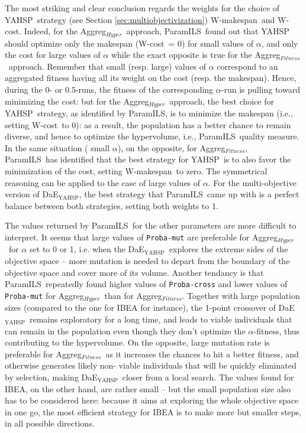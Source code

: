 \documentclass{llncs}
\newcommand{\DAEYAHSP}{{\sc DaE$_{\text{YAHSP}}$}}
\def\YAHSP{{\sc YAHSP}}
\def\PARAMILS{{\sc ParamILS}}
\def\AGGREGHYPER{{Aggreg$_{Hyper}$}}
\def\AGGREGFITNESS{{Aggreg$_{Fitness}$}}
\def\WMAKESPAN{{W-makespan}}
\def\WCOST{{W-cost}}
\begin{document}
The most striking and clear conclusion regards the weights for the choice of \YAHSP\ strategy (see Section \ref{sec:multiobjectivization}) \WMAKESPAN\ and \WCOST. Indeed, for the \AGGREGHYPER\ approach, \PARAMILS\ found out that YAHSP should optimize only the makespan (\WCOST\ = 0) for small values of $\alpha$, and only the cost for large values of $\alpha$ while the exact opposite is true for the \AGGREGFITNESS\ approach. Remember that small (resp. large) values of $\alpha$ correspond to an aggregated fitness having all its weight on the cost (resp. the makespan). Hence, during the $0$- or $0.5$-runs, the fitness of the corresponding $\alpha$-run is pulling toward minimizing the cost: but for the \AGGREGHYPER\ approach, the best choice for \YAHSP\ strategy, as identified by \PARAMILS, is to minimize the makespan (i.e., setting \WCOST\ to 0): as a result, the population has a better chance to remain diverse, and hence to optimize the hypervolume, i.e.,  \PARAMILS\ quality measure. In the same situation (
small $\alpha$), on the opposite, for \AGGREGFITNESS, \PARAMILS\ has identified that the best strategy for \YAHSP\ is to also favor the minimization of the cost, setting \WMAKESPAN\ to zero. The symmetrical reasoning can be applied to the case of large values of $\alpha$.
For the multi-objective version of \DAEYAHSP, the best strategy that \PARAMILS\ came up with is a perfect balance between both strategies, setting both weights to 1.


The values returned by \PARAMILS\ for the other parameters are more difficult to interpret. It seems that large values of {\tt Proba-mut} are preferable for \AGGREGHYPER\ for $\alpha$ set to 0 or 1, i.e. when the \DAEYAHSP\ explores the extreme sides of the objective space -- more mutation is needed to depart from the boundary of the objective space and cover more of its volume. Another tendancy is that \PARAMILS\ repeatedly found higher values of {\tt Proba-cross} and lower values of {\tt Proba-mut} for \AGGREGHYPER\ than for \AGGREGFITNESS. Together with large population sizes (compared to the one for IBEA for instance), the 1-point crossover of \DAEYAHSP\ remains exploratory for a long time, and leads to viable individuals that can remain in the population even though they don't optimize the $\alpha$-fitness, thus contributing to the hypervolume. On the opposite, large mutation rate is preferable for \AGGREGFITNESS\ as it increases the chances to hit a better fitness, and otherwise generates likely non-
viable individuals that will be quickly eliminated by selection, making \DAEYAHSP\ closer from a local search. The values found for IBEA, on the other hand, are rather small -- but the small population size also has to be considered here: because it aims at exploring the whole objective space in one go, the most efficient strategy for IBEA is to make more but smaller steps, in all possible directions.
\end{document}
